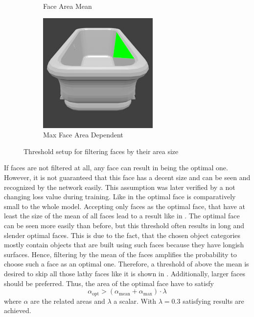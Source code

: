 \begin{figure}
\begin{subfigure}{.32\textwidth}
		\caption{Face Area Mean}
		\label{fig:face-area-mean}
	\end{subfigure}
	\begin{subfigure}{.32\textwidth}
		\centering
		\includegraphics[width=\textwidth]{images/face_area_max_dependent.png}
		\caption{Max Face Area Dependent}
		\label{fig:face-area-max-dependent}
	\end{subfigure}
	\caption{Threshold setup for filtering faces by their area size}
	\label{fig:face-area-filter}
\end{figure}
If faces are not filtered at all, any face can result in being the optimal one.
However, it is not guaranteed that this face has a decent size and can be seen and recognized by the network easily.
This assumption was later verified by a not changing loss value during training.
Like in  the optimal face is comparatively small to the whole model.
Accepting only faces as the optimal face, that have at least the size of the mean of all faces lead to a result like in .
The optimal face can be seen more easily than before, but this threshold often results in long and slender optimal faces.
This is due to the fact, that the chosen object categories mostly contain objects that are built using such faces because they have longish surfaces.
Hence, filtering by the mean of the faces amplifies the probability to choose such a face as an optimal one.
Therefore, a threshold of above the mean is desired to skip all those lathy faces like it is shown in .
Additionally, larger faces should be preferred.
Thus, the area of the optimal face have to satisfy
\begin{equation}
	\alpha_{\text{opt}} > (\alpha_{\text{mean}} + \alpha_{\text{max}}) \cdot \lambda
\end{equation}
where $\alpha$ are the related areas and $\lambda$ a scalar.
With $\lambda = 0.3$ satisfying results are achieved.

